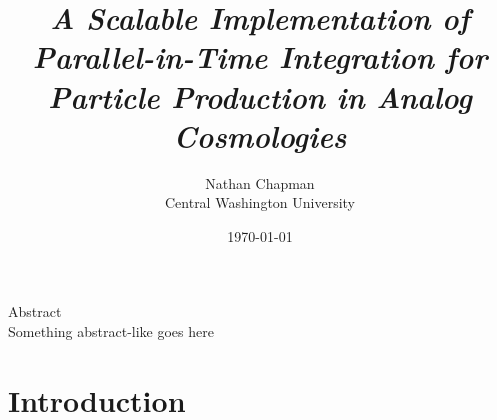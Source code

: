 \documentclass{article}
\title{\Large \vspace{-0.625in} \textit{A Scalable Implementation of Parallel-in-Time Integration for \\ Particle Production in Analog Cosmologies} \vspace{-0.15in}}
\author{Nathan Chapman \\ {\normalsize Central Washington University}}
\date{\normalsize \vspace{-0.1in}\today}
\begin{document}
\maketitle

    \begin{center}
    Abstract \\
    Something abstract-like goes here
        
        
        
    \end{center}

\tableofcontents

\pagebreak

\section{Introduction} \label{sec:intro}
\end{document}
